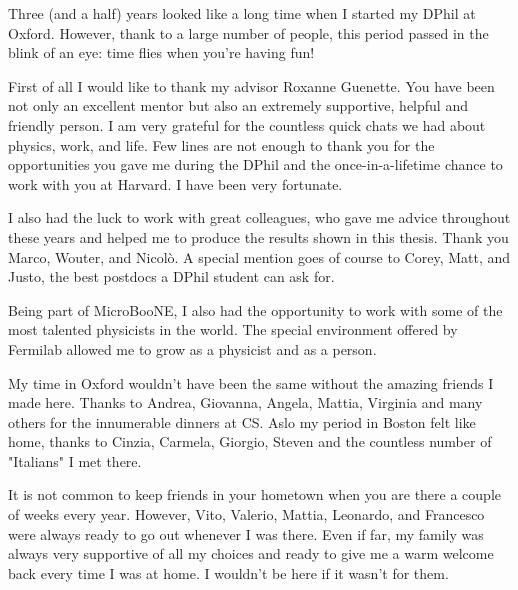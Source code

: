 Three (and a half) years looked like a long time when I started my DPhil at Oxford. However, thank to a large number of people, this period passed in the blink of an eye: time flies when you're having fun!

First of all I would like to thank my advisor Roxanne Guenette. You have been not only an excellent mentor but also an extremely supportive, helpful and friendly person. I am very grateful for the countless quick chats we had about physics, work, and life. Few lines are not enough to thank you for the opportunities you gave me during the DPhil and the once-in-a-lifetime chance to work with you at Harvard. I have been very fortunate.

I also had the luck to work with great colleagues, who gave me advice throughout these years and helped me to produce the results shown in this thesis. Thank you Marco, Wouter, and Nicolò. A special mention goes of course to Corey, Matt, and Justo, the best postdocs a DPhil student can ask for.

Being part of MicroBooNE, I also had the opportunity to work with some of the most talented physicists in the world. The special environment offered by Fermilab allowed me to grow as a physicist and as a person.

My time in Oxford wouldn't have been the same without the amazing friends I made here. Thanks to Andrea, Giovanna, Angela, Mattia, Virginia and many others for the innumerable dinners at CS.
Aslo my period in Boston felt like home, thanks to Cinzia, Carmela, Giorgio, Steven and the countless number of "Italians" I met there. 

It is not common to keep friends in your hometown when you are there a couple of weeks every year. However, Vito, Valerio, Mattia, Leonardo, and Francesco were always ready to go out whenever I was there.
Even if far, my family was always very supportive of all my choices and ready to give me a warm welcome back every time I was at home. I wouldn't be here if it wasn't for them.